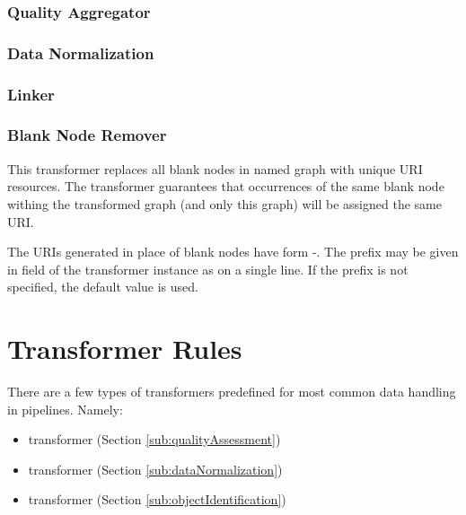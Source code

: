 \subsubsection{Quality Aggregator}

\subsubsection{Data Normalization}

\subsubsection{Linker}

\subsubsection{Blank Node Remover}
This transformer replaces all blank nodes in  named graph with unique URI resources. The transformer guarantees that occurrences of the same blank node withing the transformed graph (and only this graph) will be assigned the same URI.

The URIs generated in place of blank nodes have form -. The prefix may be given in  field of the transformer instance as  on a single line. If the prefix is not specified, the default value  is used.

\section{Transformer Rules}
\label{sec:transformerRules}

	There are a few types of {transformers} predefined for most common data handling in pipelines. Namely:
	\begin{itemize}
		\item {} {transformer} (Section \ref{sub:qualityAssessment})
		\item {} {transformer}  (Section \ref{sub:dataNormalization})
		\item {} {transformer} (Section \ref{sub:objectIdentification})
	\end{itemize}
	
